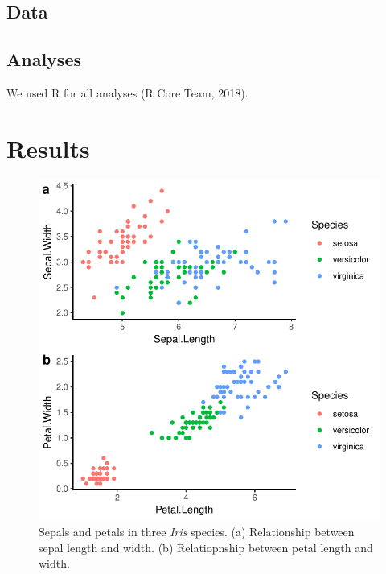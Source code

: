 \documentclass[man,floatsintext]{apa6}
\begin{document}
\hypertarget{data}{%
\subsection{Data}\label{data}}

\hypertarget{analyses}{%
\subsection{Analyses}\label{analyses}}

We used R for all analyses (R Core Team, 2018).

\hypertarget{results}{%
\section{Results}\label{results}}





\begin{figure}[!h]
\includegraphics[width=\textwidth]{../Figures/iriscorrelationsplot} \caption{Sepals and petals in three \emph{Iris}
species. (a) Relationship between sepal length and width. (b)
Relatiopnship between petal length and width.}\label{fig:iriscorrelationsplot}
\end{figure}
\end{document}
